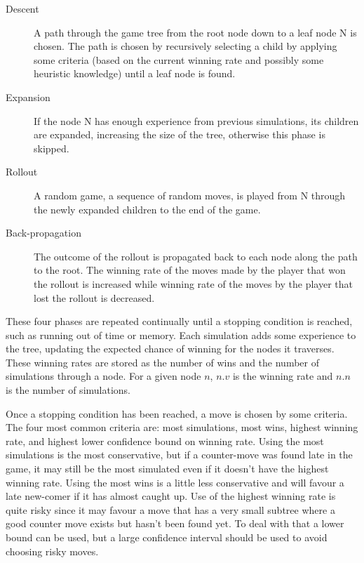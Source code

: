 \begin{description}
\item[Descent] A path through the game tree from the root node down to a leaf node N is chosen. The path is chosen by recursively selecting a child by applying some criteria (based on the current winning rate and possibly some heuristic knowledge) until a leaf node is found.
\item[Expansion] If the node N has enough experience from previous simulations, its children are expanded, increasing the size of the tree, otherwise this phase is skipped.
\item[Rollout] A random game, a sequence of random moves, is played from N through the newly expanded children to the end of the game.
\item[Back-propagation] The outcome of the rollout is propagated back to each node along the path to the root. The winning rate of the moves made by the player that won the rollout is increased while winning rate of the moves by the player that lost the rollout is decreased.
\end{description}

These four phases are repeated continually until a stopping condition is reached, such as running out of time or memory. Each simulation adds some experience to the tree, updating the expected chance of winning for the nodes it traverses. These winning rates are stored as the number of wins and the number of simulations through a node. For a given node $n$, $n.v$ is the winning rate and $n.n$ is the number of simulations.

Once a stopping condition has been reached, a move is chosen by some criteria. The four most common criteria are: most simulations, most wins, highest winning rate, and highest lower confidence bound on winning rate. Using the most simulations is the most conservative, but if a counter-move was found late in the game, it may still be the most simulated even if it doesn't have the highest winning rate. Using the most wins is a little less conservative and will favour a late new-comer if it has almost caught up. Use of the highest winning rate is quite risky since it may favour a move that has a very small subtree where a good counter move exists but hasn't been found yet. To deal with that a lower bound can be used, but a large confidence interval should be used to avoid choosing risky moves.

